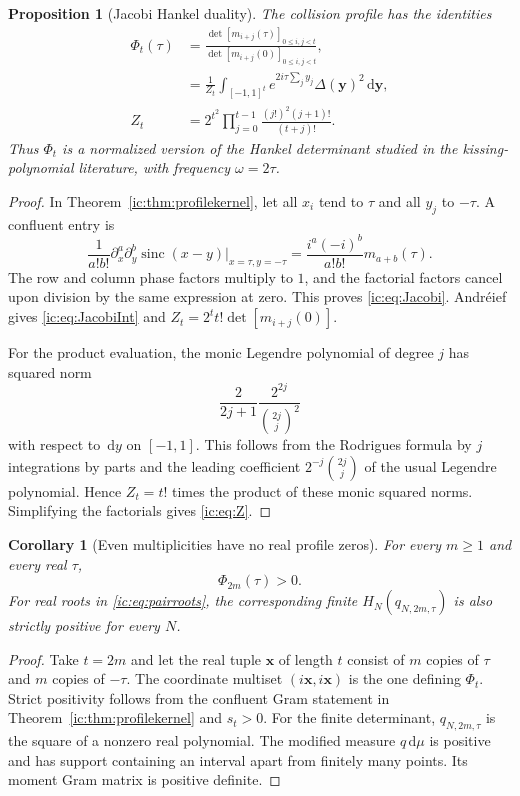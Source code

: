 \documentclass[11pt,a4paper]{article}
\numberwithin{equation}{section}
\newtheorem{proposition}[theorem]{Proposition}
\newtheorem{corollary}[theorem]{Corollary}
\theoremstyle{definition}
\theoremstyle{remark}
\newcommand{\dd}{\mathrm d}
\newcommand{\by}{\boldsymbol{y}}
\newcommand{\Del}{\Delta}
\newcommand{\sinc}{\operatorname{sinc}}
\newcommand{\bx}{\boldsymbol x}
\begin{document}
\begin{proposition}[Jacobi Hankel duality]\label{ic:prop:Jacobi}
The collision profile has the identities
\begin{align}
 \Phi_t(\tau)&=
 \frac{\det[m_{i+j}(\tau)]_{0\le i,j<t}}
      {\det[m_{i+j}(0)]_{0\le i,j<t}},\label{ic:eq:Jacobi}\\
 &=\frac1{Z_t}\int_{[-1,1]^t}
       e^{2i\tau\sum_jy_j}\Del(\by)^2\,\dd\by,\label{ic:eq:JacobiInt}\\
 Z_t&=2^{t^2}\prod_{j=0}^{t-1}
       \frac{(j!)^2(j+1)!}{(t+j)!}.\label{ic:eq:Z}
\end{align}
Thus $\Phi_t$ is a normalized version of the Hankel determinant studied
in the kissing-polynomial literature, with frequency $\omega=2\tau$.
\end{proposition}
\begin{proof}
In Theorem~\ref{ic:thm:profilekernel}, let all $x_i$ tend to $\tau$ and all
$y_j$ to $-\tau$. A confluent entry is
\[
 \frac{1}{a!b!}\partial_x^a\partial_y^b\sinc(x-y)
 \bigg|_{x=\tau,y=-\tau}
 =\frac{i^a(-i)^b}{a!b!}m_{a+b}(\tau).
\]
The row and column phase factors multiply to $1$, and the factorial
factors cancel upon division by the same expression at zero. This
proves \eqref{ic:eq:Jacobi}. Andr\'eief gives \eqref{ic:eq:JacobiInt} and
$Z_t=2^t t!\det[m_{i+j}(0)]$.

For the product evaluation, the monic Legendre polynomial of degree $j$
has squared norm
\[
 \frac{2}{2j+1}\frac{2^{2j}}{\binom{2j}{j}^2}
\]
with respect to $\,\dd y$ on $[-1,1]$. This follows from the Rodrigues
formula by $j$ integrations by parts and the leading coefficient
$2^{-j}\binom{2j}{j}$ of the usual Legendre polynomial. Hence
$Z_t=t!$ times the product of these monic squared norms. Simplifying the
factorials gives \eqref{ic:eq:Z}.
\end{proof}

\begin{corollary}[Even multiplicities have no real profile zeros]
\label{ic:cor:positive}
For every $m\ge1$ and every real $\tau$,
\begin{equation}\label{ic:eq:positive}
 \Phi_{2m}(\tau)>0.
\end{equation}
For real roots in \eqref{ic:eq:pairroots}, the corresponding finite
$H_N(q_{N,2m,\tau})$ is also strictly positive for every $N$.
\end{corollary}
\begin{proof}
Take $t=2m$ and let the real tuple $\bx$ of length $t$ consist of $m$
copies of $\tau$ and $m$ copies of $-\tau$. The coordinate multiset
$(i\bx,i\bx)$ is the one defining $\Phi_t$. Strict positivity follows
from the confluent Gram statement in Theorem~\ref{ic:thm:profilekernel} and
$s_t>0$. For the finite determinant, $q_{N,2m,\tau}$ is the square of a
nonzero real polynomial. The modified measure $q\,\dd\mu$ is positive
and has support containing an interval apart from finitely many points.
Its moment Gram matrix is positive definite.
\end{proof}
\end{document}
